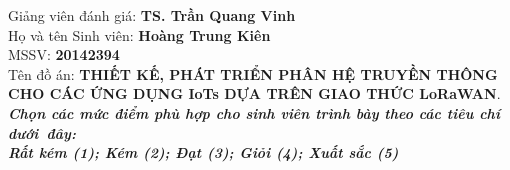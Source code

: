%
%
\thispagestyle{plain}
\begin{center}
\Large{}
\end{center}
Giảng viên đánh giá:\hspace{3cm} \textbf{TS. Trần Quang Vinh} \\
Họ và tên Sinh viên:\hspace{3.33cm} \textbf{Hoàng Trung Kiên}\\
MSSV:\hspace{6.7cm} \textbf{20142394}\\
Tên đồ án:     \textbf {THIẾT KẾ, PHÁT TRIỂN PHÂN HỆ TRUYỀN THÔNG CHO CÁC ỨNG DỤNG IoTs DỰA TRÊN GIAO THỨC LoRaWAN}.\\
\emph{\textbf{Chọn các mức điểm phù hợp cho sinh viên trình bày theo các tiêu chí dưới~đây:\\
Rất kém (1); Kém (2); Đạt (3); Giỏi (4); Xuất sắc (5)}} \\
